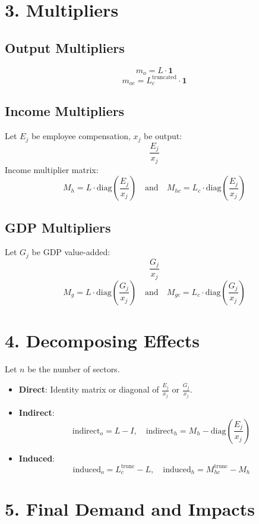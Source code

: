 \documentclass{article}
\begin{document}
\section*{3. Multipliers}

\subsection*{Output Multipliers}
\[
m_o = L \cdot \mathbf{1}
\]
\[
m_{oc} = L_c^{\text{truncated}} \cdot \mathbf{1}
\]

\subsection*{Income Multipliers}

Let $E_j$ be employee compensation, $x_j$ be output:
\[
\frac{E_j}{x_j}
\]
Income multiplier matrix:
\[
M_h = L \cdot \text{diag}\left(\frac{E_j}{x_j}\right)
\quad \text{and} \quad
M_{hc} = L_c \cdot \text{diag}\left(\frac{E_j}{x_j}\right)
\]

\subsection*{GDP Multipliers}

Let $G_j$ be GDP value-added:
\[
\frac{G_j}{x_j}
\]
\[
M_g = L \cdot \text{diag}\left(\frac{G_j}{x_j}\right)
\quad \text{and} \quad
M_{gc} = L_c \cdot \text{diag}\left(\frac{G_j}{x_j}\right)
\]

\section*{4. Decomposing Effects}

Let $n$ be the number of sectors.

\begin{itemize}
  \item \textbf{Direct}: Identity matrix or diagonal of $\frac{E_j}{x_j}$ or $\frac{G_j}{x_j}$.
  \item \textbf{Indirect}: 
    \[
    \text{indirect}_o = L - I,\quad
    \text{indirect}_h = M_h - \text{diag}\left(\frac{E_j}{x_j}\right)
    \]
  \item \textbf{Induced}: 
    \[
    \text{induced}_o = L_c^{\text{trunc}} - L,\quad
    \text{induced}_h = M_{hc}^{\text{trunc}} - M_h
    \]
\end{itemize}

\section*{5. Final Demand and Impacts}
\end{document}
